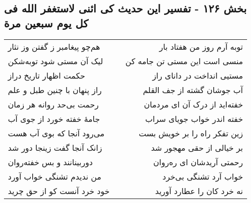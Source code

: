 \begin{center}
\section*{بخش ۱۲۶ - تفسیر این حدیث کی ائنی لاستغفر الله فی کل یوم سبعین مرة}
\label{sec:sh126}
\begin{longtable}{l p{0.5cm} r}
هم‌چو پیغامبر ز گفتن وز نثار
&&
توبه آرم روز من هفتاد بار
\\
لیک آن مستی شود توبه‌شکن
&&
منسی است این مستی تن جامه کن
\\
حکمت اظهار تاریخ دراز
&&
مستیی انداخت در دانای راز
\\
راز پنهان با چنین طبل و علم
&&
آب جوشان گشته از جف القلم
\\
رحمت بی‌حد روانه هر زمان
&&
خفته‌اید از درک آن ای مردمان
\\
جامهٔ خفته خورد از جوی آب
&&
خفته اندر خواب جویای سراب
\\
می‌رود آنجا که بوی آب هست
&&
زین تفکر راه را بر خویش بست
\\
زانک آنجا گفت زینجا دور شد
&&
بر خیالی از حقی مهجور شد
\\
دوربینانند و بس خفته‌روان
&&
رحمتی آریدشان ای ره‌روان
\\
من ندیدم تشنگی خواب آورد
&&
خواب آرد تشنگی بی‌خرد
\\
خود خرد آنست کو از حق چرید
&&
نه خرد کان را عطارد آورید
\\
\end{longtable}
\end{center}
